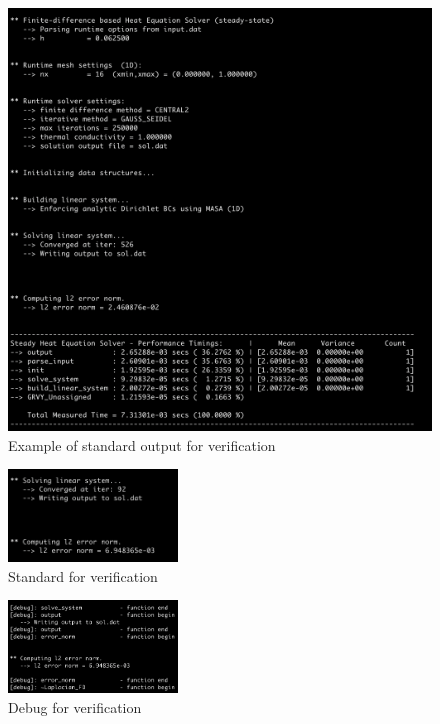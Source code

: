 \documentclass[a4paper]{article}
\begin{document}
\begin{figure}[htbp]
\centering
\includegraphics[width=1\textwidth]{example.png}
\caption{\label{eg}Example of standard output for verification}
\end{figure}

\begin{figure}
\centering
\includegraphics[width=0.4\textwidth]{std_v.png}
\caption{\label{std_v}Standard for verification}
\end{figure}

\begin{figure}
\centering
\includegraphics[width=0.4\textwidth]{debug_v.png}
\caption{\label{debug_v}Debug for verification}
\end{figure}
\end{document}
